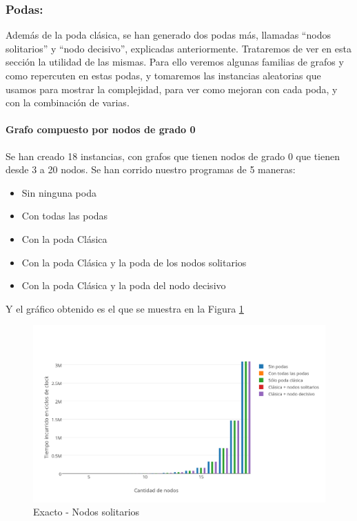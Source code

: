\vspace*{0.6cm}

\subsubsection{Podas:}

Además de la poda clásica, se han generado dos podas más, llamadas ``nodos solitarios'' y ``nodo decisivo'', explicadas anteriormente. Trataremos de ver en esta sección la utilidad de las mismas. Para ello veremos algunas familias de grafos y como repercuten en estas podas, y tomaremos las instancias aleatorias que usamos para mostrar la complejidad, para ver como mejoran con cada poda, y con la combinación de varias.

\paragraph{Grafo compuesto por nodos de grado 0}

Se han creado 18 instancias, con grafos que tienen nodos de grado 0 que tienen desde 3 a 20 nodos. Se han corrido nuestro programas de 5 maneras:

\begin{itemize}
	\item Sin ninguna poda
	\item Con todas las podas 
	\item Con la poda Clásica
	\item Con la poda Clásica y la poda de los nodos solitarios
	\item Con la poda Clásica y la poda del nodo decisivo
\end{itemize}

Y el gráfico obtenido es el que se muestra en la Figura \ref{fig:1C}

\begin{figure}[htb]
	\begin{center}
    		\includegraphics[scale=0.6]{imagenes/exacto-solitarios.png}
	\end{center}
	\caption{Exacto - Nodos solitarios}\label{fig:1C}
\end{figure}
\FloatBarrier

